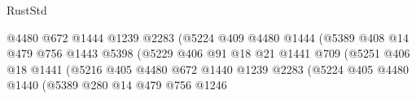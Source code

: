 \begin{lexlean}{RustStd}
\begin{coremodule}
                                                @4480
                                                @672
                                                @1444
                                                @1239
                                                @2283
                                                (@5224
                                                  @409
                                                  @4480
                                                  @1444
                                                  (@5389
                                                    @408
                                                    @14
                                                    @479
                                                    @756
                                                    @1443
                                                    @5398
                                                    (@5229
                                                      @406
                                                      @91
                                                      @18
                                                      @21
                                                      @1441
                                                      @709
                                                      (@5251
                                                        @406
                                                        @18
                                                        @1441
                                                        (@5216
                                                          @405
                                                          @4480
                                                          @672
                                                          @1440
                                                          @1239
                                                          @2283
                                                          (@5224
                                                            @405
                                                            @4480
                                                            @1440
                                                            (@5389
                                                              @280
                                                              @14
                                                              @479
                                                              @756
                                                              @1246

\end{coremodule}
\end{lexlean}

